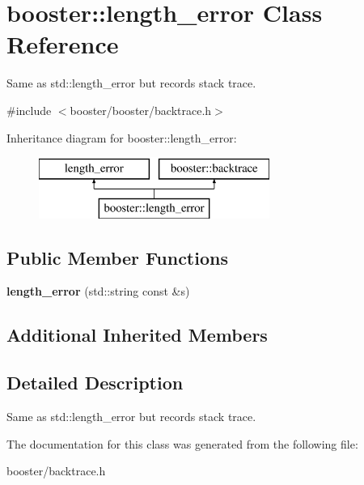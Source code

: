\section{booster\-:\-:length\-\_\-error Class Reference}
\label{classbooster_1_1length__error}


Same as std\-::length\-\_\-error but records stack trace.  




{\ttfamily \#include $<$booster/booster/backtrace.\-h$>$}

Inheritance diagram for booster\-:\-:length\-\_\-error\-:\begin{figure}[H]
\begin{center}
\leavevmode
\includegraphics[height=2.000000cm]{classbooster_1_1length__error}
\end{center}
\end{figure}
\subsection*{Public Member Functions}
\begin{DoxyCompactItemize}
\item 
{\bfseries length\-\_\-error} (std\-::string const \&s)\label{classbooster_1_1length__error_a38d9c01105d54f14c960a8f6fd04b893}

\end{DoxyCompactItemize}
\subsection*{Additional Inherited Members}


\subsection{Detailed Description}
Same as std\-::length\-\_\-error but records stack trace. 

The documentation for this class was generated from the following file\-:\begin{DoxyCompactItemize}
\item 
booster/backtrace.\-h\end{DoxyCompactItemize}
